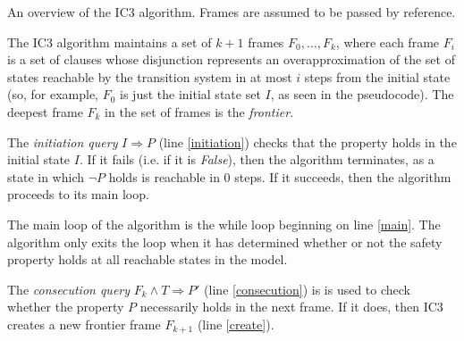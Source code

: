 \documentclass[12pt,a4paper,twoside,openright]{report}
\begin{document}
{\begin{algorithm}[t]
\DontPrintSemicolon
{}
\caption{An overview of the IC3 algorithm. Frames are assumed to be passed by reference.}
\label{overview}
\end{algorithm}

The IC3 algorithm maintains a set of $k + 1$ frames $F_0,\ldots,F_k$, where
each frame $F_i$ is a set of clauses whose disjunction represents an
overapproximation of the set of states reachable by the transition
system in at most $i$ steps from the initial state
(so, for example, $F_0$ is just the initial state set $I$, as seen
in the pseudocode).
The deepest frame $F_k$ in the set of frames is the \emph{frontier}.

The \emph{initiation query} $I \Rightarrow P$ (line \ref{initiation}) checks that
the property holds in the initial state $I$.
If it fails (i.e. if it is {\it False}), then the algorithm terminates,
as a state in which $\neg P$ holds is reachable in 0 steps.
If it succeeds, then the algorithm proceeds to its main loop.

The main loop of the algorithm is the while loop beginning on line \ref{main}.
The algorithm only exits the loop when it has determined whether or not the
safety property holds at all reachable states in the model.

The \emph{consecution query} $F_k \wedge T \Rightarrow P'$ (line \ref{consecution}) is
is used to check whether the property $P$ necessarily holds in the next
frame. If it does, then IC3 creates a new
frontier frame $F_{k + 1}$ (line \ref{create}).

}
\end{document}
